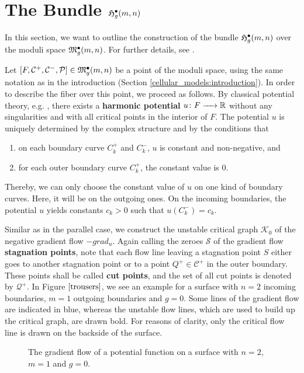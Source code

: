 \section{The Bundle \texorpdfstring{$\mathfrak{H}^{\bullet}_g(m, n)$}{{H\_g(m, n)}}}
\label{cellular:radial_bundle}

In this section, we want to outline the construction of the bundle $\mathfrak{H}^{\bullet}_g(m, n)$ over the moduli space $\mathfrak{M}^\bullet_g(m, n)$.
For further details, see \cite{Boedigheimer2006}.

Let $[F, \mathcal C^+, \mathcal C^-, \mathcal P] \in \mathfrak{M}^\bullet_g(m, n)$ be a point of the moduli space, using the same notation as in the introduction (Section \ref{cellular_models:introduction}).
In order to describe the fiber over this point, we proceed as follows.
By classical potential theory, e.g. \cite[Theorem I.25]{opac-b1083717}, there exists a \textbf{harmonic potential} $u \colon F \xrightarrow{\hspace{6pt}{}\hspace{6pt}} \mathbb R$
without any singularities and with all critical points in the interior of $F$.
The potential $u$ is uniquely determined by the complex structure and by the conditions that 
\begin{enumerate}
 \item on each boundary curve $C^+_k$ and $C^-_k$, $u$ is constant and non-negative, and
 \item for each outer boundary curve $C^+_k$, the constant value is $0$.
\end{enumerate}
Thereby, we can only choose the constant value of $u$ on one kind of boundary curves.
Here, it will be on the outgoing ones.
On the incoming boundaries, the potential $u$ yields constants $c_k > 0$ such that $u(C^-_k) = c_k$.

Similar as in the parallel case, we construct the unstable critical graph $\mathcal K_0$ of the negative gradient flow $- grad_u$.
Again calling the zeroes $\mathcal S$ of the gradient flow \textbf{stagnation points},
note that each flow line leaving a stagnation point $S$ either goes to another stagnation point or to a point $Q^+ \in \mathcal C^+$ in the outer boundary.
These points shall be called \textbf{cut points}, and the set of all cut points is denoted by $\mathcal Q^+$.
In Figure $\ref{trousers}$, we see an example for a surface with $n = 2$ incoming boundaries, $m = 1$ outgoing boundaries and $g = 0$.
Some lines of the gradient flow are indicated in blue, whereas the unstable flow lines, which are used to build up the critical graph, are drawn bold.
For reasons of clarity, only the critical flow line is drawn on the backside of the surface.

\begin{figure}[ht]
    \centering
    \def\svgwidth{.7\columnwidth}
    
    \caption{
        \label{trousers}
        The gradient flow of a potential function on a surface with $n = 2$, $m = 1$ and $g = 0$.}
\end{figure}

